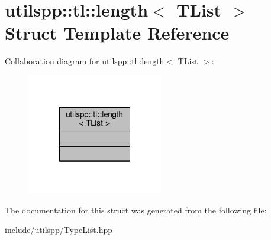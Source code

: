 \hypertarget{structutilspp_1_1tl_1_1length}{\section{utilspp\-:\-:tl\-:\-:length$<$ T\-List $>$ Struct Template Reference}
\label{structutilspp_1_1tl_1_1length}
}


Collaboration diagram for utilspp\-:\-:tl\-:\-:length$<$ T\-List $>$\-:
\nopagebreak
\begin{figure}[H]
\begin{center}
\leavevmode
\includegraphics[width=168pt]{structutilspp_1_1tl_1_1length__coll__graph}
\end{center}
\end{figure}


The documentation for this struct was generated from the following file\-:\begin{DoxyCompactItemize}
\item 
include/utilspp/Type\-List.\-hpp\end{DoxyCompactItemize}
